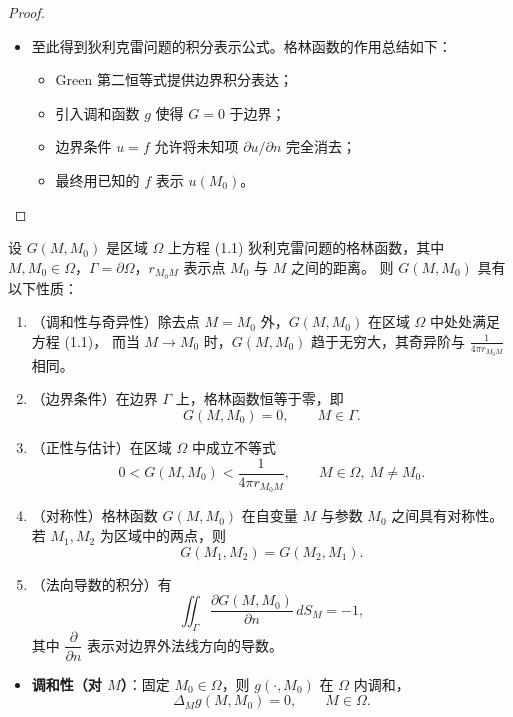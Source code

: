 \begin{note}[式 (2.7) 的来源与意义]
\begin{proof}
\begin{itemize}
  \item 至此得到狄利克雷问题的积分表示公式。格林函数的作用总结如下：
  \begin{itemize}
    \item Green 第二恒等式提供边界积分表达；
    \item 引入调和函数 $g$ 使得 $G=0$ 于边界；
    \item 边界条件 $u=f$ 允许将未知项 $\partial u/\partial n$ 完全消去；
    \item 最终用已知的 $f$ 表示 $u(M_0)$。
  \end{itemize}

\end{itemize}
\end{proof}

\begin{theorem}[格林函数的基本性质]
设 $G(M,M_0)$ 是区域 $\Omega$ 上方程 (1.1) 狄利克雷问题的格林函数，其中
$M,M_0\in\Omega$，$\Gamma=\partial\Omega$，$r_{M_0M}$ 表示点 $M_0$ 与 $M$ 之间的距离。
则 $G(M,M_0)$ 具有以下性质：

\begin{enumerate}
  \item （调和性与奇异性）除去点 $M=M_0$ 外，$G(M,M_0)$ 在区域 $\Omega$ 中处处满足方程 (1.1)，
        而当 $M\to M_0$ 时，$G(M,M_0)$ 趋于无穷大，其奇异阶与
        \(\displaystyle \frac{1}{4\pi r_{M_0M}}\) 相同。

  \item （边界条件）在边界 $\Gamma$ 上，格林函数恒等于零，即
        \[
        G(M,M_0)=0,\qquad M\in\Gamma .
        \]

  \item （正性与估计）在区域 $\Omega$ 中成立不等式
        \[
        0 < G(M,M_0) < \frac{1}{4\pi r_{M_0M}},\qquad M\in\Omega,\ M\neq M_0 .
        \]

  \item （对称性）格林函数 $G(M,M_0)$ 在自变量 $M$ 与参数 $M_0$ 之间具有对称性。
        若 $M_1,M_2$ 为区域中的两点，则
        \[
        G(M_1,M_2)=G(M_2,M_1).
        \]

  \item （法向导数的积分）有
        \[
        \iint_{\Gamma} \frac{\partial G(M,M_0)}{\partial n}\, dS_M = -1,
        \]
        其中 $\dfrac{\partial}{\partial n}$ 表示对边界外法线方向的导数。
\end{enumerate}
\end{theorem}
\begin{dxtips}
    \begin{itemize}
  \item \textbf{调和性（对 $M$）}：固定 $M_0\in\Omega$，则 $g(\cdot,M_0)$ 在 $\Omega$ 内调和，
  \[
  \Delta_M g(M,M_0)=0,\qquad M\in\Omega.
  \]


\end{itemize}
\end{dxtips}
\end{note}
